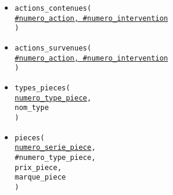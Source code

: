 \documentclass[a4paper,11pt]{article} %
\begin{document}
\begin{itemize}[leftmargin=*]
{        tarif\_action \\
    )}
    \item \texttt{actions\_contenues( \\
        \underline{\#numero\_action, \#numero\_intervention} \\
    )}
    \item \texttt{actions\_survenues( \\
        \underline{\#numero\_action, \#numero\_intervention} \\
    )}
    \item \texttt{types\_pieces( \\
        \underline{numero\_type\_piece}, \\
        nom\_type \\
    )}

    \newpage
    \item \texttt{pieces( \\
        \underline{numero\_serie\_piece}, \\
        \#numero\_type\_piece, \\
        prix\_piece, \\
        marque\_piece \\
    )}
    

\end{itemize}
\end{document}
